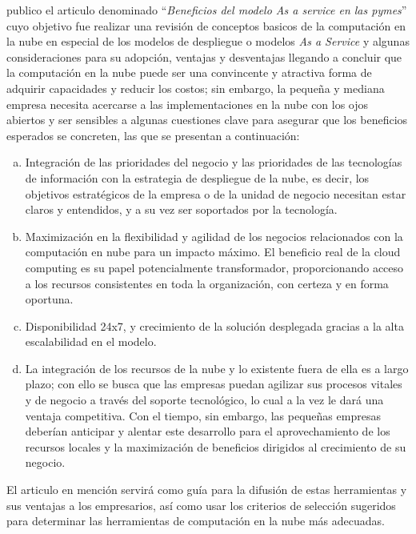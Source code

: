 \cite{jrodriguez} publico el articulo denominado ``\emph{Beneficios del modelo As a
service en las pymes}'' cuyo objetivo fue realizar una revisión de conceptos
basicos de la computación en la nube en especial de los modelos de despliegue
o modelos \emph{As a Service} y algunas consideraciones para su adopción, ventajas
y desventajas llegando a concluir que la computación en la nube puede ser una
convincente y atractiva forma de adquirir capacidades y reducir los costos; sin
embargo, la pequeña y mediana empresa necesita acercarse a las implementaciones
en la nube con los ojos abiertos y ser sensibles a algunas cuestiones clave para
asegurar que los beneficios esperados se concreten, las que se presentan a
continuación:
\begin{enumerate}[a.]
    \item Integración de las prioridades del negocio y las prioridades de las
          tecnologías de información con la estrategia de despliegue de la
          nube, es decir, los objetivos estratégicos de la empresa o de la
          unidad de negocio necesitan estar claros y entendidos, y a su vez ser
          soportados por la tecnología.
    \item Maximización en la flexibilidad y agilidad de los negocios
          relacionados con la computación en nube para un impacto máximo.
          El beneficio real de la cloud computing es su papel potencialmente
          transformador, proporcionando acceso a los recursos consistentes en
          toda la organización, con certeza y en forma oportuna.
    \item Disponibilidad 24x7, y crecimiento de la solución desplegada gracias
          a la alta escalabilidad en el modelo.
    \item La integración de los recursos de la nube y lo existente fuera de
          ella es a largo plazo; con ello se busca que las empresas puedan agilizar
          sus procesos vitales y de negocio a través del soporte tecnológico,
          lo cual a la vez le dará una ventaja competitiva. Con el tiempo, sin
          embargo, las pequeñas empresas deberían anticipar y alentar este
          desarrollo para el aprovechamiento de los recursos locales y la maximización
          de beneficios dirigidos al crecimiento de su negocio.
\end{enumerate}

El articulo en mención servirá como guía para la difusión de estas herramientas
y sus ventajas a los empresarios, así como usar los criterios de selección
sugeridos para determinar las herramientas de computación en la nube más
adecuadas.

